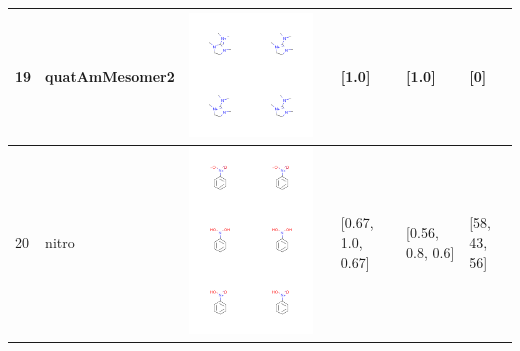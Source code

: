 \begin{longtable}{|l|l|l|l|l|l|l|}
\hline
19 & quatAmMesomer2 & \includegraphics[scale=0.6]{quatAmMesomer2CA.png} & & [1.0]& [1.0] & [0] \\
\hline
20 & nitro & \includegraphics[scale=0.6]{nitroCA.png} & & [0.67, 1.0, 0.67]& [0.56, 0.8, 0.6] & [58, 43, 56] \\

\end{longtable}
